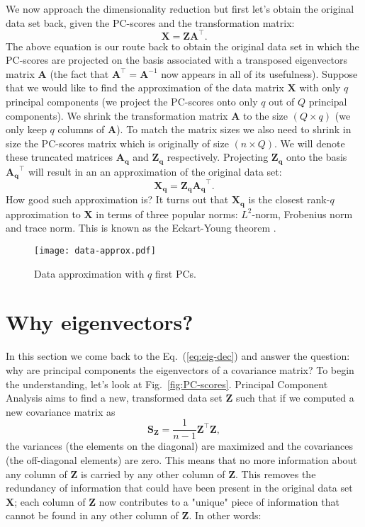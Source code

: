 \documentclass[10pt,twocolumn]{article}
\begin{document}
We now approach the dimensionality reduction but first let's obtain the original data set back, given the PC-scores and the transformation matrix:
\begin{equation} \label{eq:X-retrieval}
\mathbf{X} = \mathbf{Z} \mathbf{A}^{\top}.
\end{equation}
The above equation is our route back to obtain the original data set in which the PC-scores are projected on the basis associated with a transposed eigenvectors matrix $\mathbf{A}$ (the fact that $\mathbf{A}^{\top} = \mathbf{A}^{-1}$ now appears in all  of its usefulness).
Suppose that we would like to find the approximation of the data matrix $\mathbf{X}$ with only $q$ principal components (we project the PC-scores onto only $q$ out of $Q$ principal components).
We shrink the transformation matrix $\mathbf{A}$ to the size $(Q \times q)$ (we only keep $q$ columns of $\mathbf{A}$). To match the matrix sizes we also need to shrink in size the PC-scores matrix which is originally of size $(n \times Q)$. We will denote these truncated matrices $\mathbf{A_q}$ and $\mathbf{Z_q}$ respectively.
Projecting $\mathbf{Z_q}$ onto the basis $\mathbf{A_q}^{\top}$ will result in an an approximation of the original data set:
\begin{equation} \label{eq:X-approximation}
\mathbf{X_q} = \mathbf{Z_q} \mathbf{A_q}^{\top}.
\end{equation}
How good such approximation is? It turns out that $\mathbf{X_q}$ is the closest rank-$q$ approximation to $\mathbf{X}$ in terms of three popular norms: $L^2$-norm, Frobenius norm and trace norm. This is known as the Eckart-Young theorem \cite{eckart-young}.
\begin{figure}[t]
\centering\texttt{[image: data-approx.pdf]}
\caption{Data approximation with $q$ first PCs.}
\label{fig:data-approx}
\end{figure}

\section{Why eigenvectors?}

In this section we come back to the Eq.~(\ref{eq:eig-dec}) and answer the question: why are principal components the eigenvectors of a covariance matrix? 
To begin the understanding, let's look at Fig.~\ref{fig:PC-scores}. Principal Component Analysis aims to find a new, transformed data set $\mathbf{Z}$ such that if we computed a new covariance matrix as
\begin{equation}
\mathbf{S_Z} =  \frac{1}{n-1} \mathbf{Z}^{\top} \mathbf{Z},
\end{equation}
the variances (the elements on the diagonal) are maximized and the covariances (the off-diagonal elements) are zero. This means that no more information about any column of $\mathbf{Z}$ is carried by any other column of $\mathbf{Z}$. This removes the redundancy of information that could have been present in the original data set $\mathbf{X}$; each column of $\mathbf{Z}$ now contributes to a "unique" piece of information that cannot be found in any other column of $\mathbf{Z}$. In other words:
\end{document}
